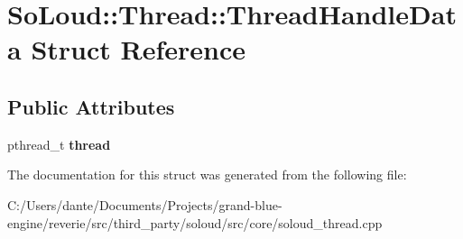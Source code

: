 \hypertarget{struct_so_loud_1_1_thread_1_1_thread_handle_data}{}\section{So\+Loud\+::Thread\+::Thread\+Handle\+Data Struct Reference}
\label{struct_so_loud_1_1_thread_1_1_thread_handle_data}
\subsection*{Public Attributes}
\begin{DoxyCompactItemize}
\item 
\mbox{\label{struct_so_loud_1_1_thread_1_1_thread_handle_data_a3d5ec72ae846c2e6ed2c7fc2700f16d4}} 
pthread\+\_\+t {\bfseries thread}
\end{DoxyCompactItemize}


The documentation for this struct was generated from the following file\+:\begin{DoxyCompactItemize}
\item 
C\+:/\+Users/dante/\+Documents/\+Projects/grand-\/blue-\/engine/reverie/src/third\+\_\+party/soloud/src/core/soloud\+\_\+thread.\+cpp\end{DoxyCompactItemize}
